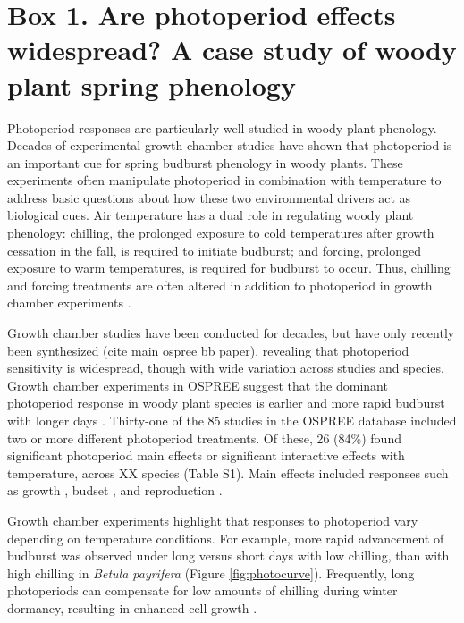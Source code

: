 \documentclass{article}
\begin{document}
\section*{Box 1. Are photoperiod effects widespread? A case study of woody plant spring phenology}
Photoperiod responses are particularly well-studied in woody plant phenology. Decades of experimental growth chamber studies have shown that photoperiod is an important cue for spring budburst phenology in woody plants. These experiments often manipulate photoperiod in combination with temperature to address basic questions about how these two environmental drivers act as biological cues. Air temperature has a dual role in regulating woody plant phenology: chilling, the prolonged exposure to cold temperatures after growth cessation in the fall, is required to initiate budburst; and forcing, prolonged exposure to warm temperatures, is required for budburst to occur. Thus, chilling and forcing treatments are often altered in addition to photoperiod in growth chamber experiments \citep[e.g.,][]{Campbell:1975aa,HEIDE:1977aa,Falusi:1990aa,Spann:2004aa,Laube:2014a}. 
\par Growth chamber studies have been conducted for decades, but have only recently been synthesized (cite main ospree bb paper), revealing that photoperiod sensitivity is widespread, though with wide variation across studies and species. Growth chamber experiments in OSPREE suggest that the dominant photoperiod response in woody plant species is earlier and more rapid budburst with longer days \citep [e.g., ][]{Caffarra:2011a}. Thirty-one of the 85 studies in the OSPREE database included two or more different photoperiod treatments. Of these, 26 (84\%) found significant photoperiod main effects or significant interactive effects with temperature, across XX species (Table S1). Main effects included responses such as growth \citep[e.g., higher growth rates with longer days][]{Ashby:1962aa}, budset \citep[e.g., more rapid induction of budset with shorter days][]{Howe:1995aa}, and reproduction \citep[e.g., increased flowering with longer days][]{Heide:2012aa}. 
\par Growth chamber experiments highlight that responses to photoperiod vary depending on temperature conditions. For example, more rapid advancement of budburst was observed under long versus short days with low chilling, than with high chilling in \emph{Betula payrifera} \citep{Hawkins:2012} (Figure \ref{fig:photocurve}). Frequently, long photoperiods can compensate for low amounts of chilling during winter dormancy, resulting in enhanced cell growth \citep{Heide:1993,Myking:1995,Caffarra:2011b}.%
\end{document}
